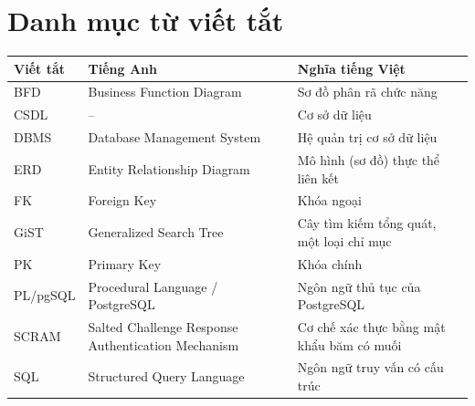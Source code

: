 \section*{Danh mục từ viết tắt}
\vspace{2pt}

\begin{center}
\fontsize{12pt}{15pt}\selectfont
\renewcommand{\arraystretch}{1.04}
\begin{tabularx}{\textwidth}{|P{1.9cm}|P{7.2cm}|Y|}
\hline
\textbf{Viết tắt} & \textbf{Tiếng Anh} & \textbf{Nghĩa tiếng Việt} \\
\hline
BFD & Business Function Diagram & Sơ đồ phân rã chức năng \\
\hline
CSDL & -- & Cơ sở dữ liệu \\
\hline
DBMS & Database Management System & Hệ quản trị cơ sở dữ liệu \\
\hline
ERD & Entity Relationship Diagram & Mô hình (sơ đồ) thực thể liên kết \\
\hline
FK & Foreign Key & Khóa ngoại \\
\hline
GiST & Generalized Search Tree & Cây tìm kiếm tổng quát, một loại chỉ mục \\
\hline
PK & Primary Key & Khóa chính \\
\hline
{\fontsize{11pt}{14pt}\selectfont PL/pgSQL} & Procedural Language / PostgreSQL & Ngôn ngữ thủ tục của PostgreSQL \\
\hline
SCRAM & Salted Challenge Response Authentication Mechanism & Cơ chế xác thực bằng mật khẩu băm có muối \\
\hline
SQL & Structured Query Language & Ngôn ngữ truy vấn có cấu trúc \\
\hline
\end{tabularx}
\end{center}
